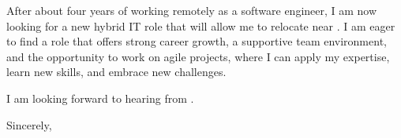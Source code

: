 \documentclass[10pt, a4paper]{article}
\begin{document}
After about four years of working remotely as a software engineer, I am now looking for a new hybrid IT role that will allow me to relocate near \CITY. I am eager to find a role that offers strong career growth, a supportive team environment, and the opportunity to work on agile projects, where I can apply my expertise, learn new skills, and embrace new challenges.

I am looking forward to hearing from \COMPANY. 

\bigskip

Sincerely,

\vspace{1pt}

\firstName\ \lastName
\end{document}
